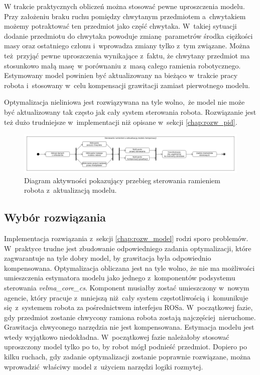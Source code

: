 W trakcie praktycznych obliczeń można stosować pewne uproszczenia modelu. Przy założeniu braku ruchu pomiędzy chwytanym przedmiotem a~chwytakiem możemy potraktować ten przedmiot jako część chwytaka. W~takiej sytuacji dodanie przedmiotu do chwytaka powoduje zmianę parametrów środka ciężkości masy oraz ostatniego członu i~wprowadza zmiany tylko z~tym związane. Można też przyjąć pewne uproszczenia wynikające z~faktu, że chwytany przedmiot ma stosunkowo małą masę w porównaniu z~masą całego ramienia robotycznego. Estymowany model powinien być aktualizowany na bieżąco w~trakcie pracy robota i~stosowany w~celu kompensacji grawitacji zamiast pierwotnego modelu.

Optymalizacja nieliniowa jest rozwiązywana na tyle wolno, że model nie może być aktualizowany tak często jak cały system sterowania robota. Rozwiązanie jest też dużo trudniejsze w~implementacji niż opisane w~sekcji \ref{chap:rozw_pid}. 

\begin{figure}
	\centering
	\includegraphics[width=.99\textwidth]{images/komp_model.png}
	\caption{Diagram aktywności pokazujący przebieg sterowania ramieniem robota z~aktualizacją modelu.}
	\label{fig:kompensacja}
\end{figure}

\subsection{Wybór rozwiązania}

Implementacja rozwiązania z~sekcji \ref{chap:rozw_model} rodzi sporo problemów. W~praktyce trudne jest zbudowanie odpowiedniego zadania optymalizacji, które zagwarantuje na tyle dobry model, by grawitacja była odpowiednio kompensowana. Optymalizacja obliczana jest na tyle wolno, że nie ma możliwości umieszczenia estymatora modelu jako jednego z~komponentów podsystemu sterowania \textit{velma\_core\_cs}. Komponent musiałby zostać umieszczony w~nowym agencie, który pracuje z~mniejszą niż cały system częstotliwością i~komunikuje się z~systemem robota za pośrednictwem interfejsu ROSa. W~początkowej fazie, gdy przedmiot zostanie chwycony ramiona robota zostają najczęściej nieruchome. Grawitacja chwyconego narzędzia nie jest kompensowana. Estymacja modelu jest wtedy wyjątkowo niedokładna. W~początkowej fazie należałoby stosować uproszczony model tylko po to, by robot mógł podnieść przedmiot. Dopiero po kilku ruchach, gdy zadanie optymalizacji zostanie poprawnie rozwiązane, można wprowadzić właściwy model z~użyciem narzędzi logiki rozmytej.

